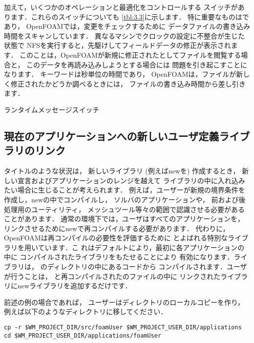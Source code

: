 加えて，いくつかのオペレーションと最適化をコントロールする
スイッチがあります．これらのスイッチについても
\autoref{tbl:3.3}に示します．
特に重要なものはであり，
OpenFOAMでは，変更をチェックするために
データファイルの書き込み時間をスキャンしています．
異なるマシンでクロックの設定に不整合が生じた状態で
NFSを実行すると，先駆けしてフィールドデータの修正が表示されます．
このことは，OpenFOAMが新規に修正されたとしてファイルを閲覧する場合と，
このデータを再読み込みしようとする場合には
問題を引き起こすことになります．
キーワードは秒単位の時間であり，
OpenFOAMは，ファイルが新しく修正されたかどうか調べるときには，
ファイルの書き込み時間から差し引きます．


\begin{table}[ht]
 
 \caption{ランタイムメッセージスイッチ}
 \label{tbl:3.3}
\end{table}


\subsection{現在のアプリケーションへの新しいユーザ定義ライブラリのリンク}
\label{ssec:3.2.6}
タイトルのような状況は，
新しいライブラリ (例えばnewを) 作成するとき，
新しい宣言およびアプリケーションのレンジを越えて
ライブラリの中に入れ込みたい場合に生じることが考えられます．
例えば，ユーザーが新規の境界条件を作成し，newの中でコンパイルし，
ソルバのアプリケーションや，
前および後処理用のユーティリティ，
メッシュツール等々の範囲で認識させる必要があることがあります．
通常の環境下では，ユーザはすべてのアプリケーションを，
リンクさせるためにnewで再コンパイルする必要があります．
代わりに，OpenFOAMは再コンパイルの必要性を評価するために
%
%
とよばれる特別なライブラリを用いています．こ
れはデフォルトにより，最初に各アプリケーションの中に
コンパイルされたライブラリをもたせることにより
有効になります．ライブラリは，
のディレクトリの中にあるコードから
コンパイルされます．ユーザが行うことは，
と再コンパイルされたのファイルの中に
リンクされたライブラリにnewライブラリを追加するだけです．

前述の例の場合であれば，
ユーザーはディレクトリのローカルコピーを作り，
例えば以下のようなディレクトリに移してください．
\begin{OFterminal}
\begin{verbatim}
cp -r $WM_PROJECT_DIR/src/foamUser $WM_PROJECT_USER_DIR/applications
cd $WM_PROJECT_USER_DIR/applications/foamUser
\end{verbatim}%
\end{OFterminal}

